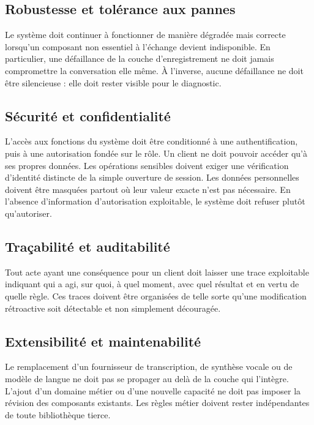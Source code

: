 \subsection{Robustesse et tolérance aux pannes}

Le système doit continuer à fonctionner de manière dégradée mais correcte lorsqu'un composant non essentiel à l'échange devient indisponible. En particulier, une défaillance de la couche d'enregistrement ne doit jamais compromettre la conversation elle même. À l'inverse, aucune défaillance ne doit être silencieuse : elle doit rester visible pour le diagnostic.

\subsection{Sécurité et confidentialité}

L'accès aux fonctions du système doit être conditionné à une authentification, puis à une autorisation fondée sur le rôle. Un client ne doit pouvoir accéder qu'à ses propres données. Les opérations sensibles doivent exiger une vérification d'identité distincte de la simple ouverture de session. Les données personnelles doivent être masquées partout où leur valeur exacte n'est pas nécessaire. En l'absence d'information d'autorisation exploitable, le système doit refuser plutôt qu'autoriser.

\subsection{Traçabilité et auditabilité}

Tout acte ayant une conséquence pour un client doit laisser une trace exploitable indiquant qui a agi, sur quoi, à quel moment, avec quel résultat et en vertu de quelle règle. Ces traces doivent être organisées de telle sorte qu'une modification rétroactive soit détectable et non simplement découragée.

\subsection{Extensibilité et maintenabilité}

Le remplacement d'un fournisseur de transcription, de synthèse vocale ou de modèle de langue ne doit pas se propager au delà de la couche qui l'intègre. L'ajout d'un domaine métier ou d'une nouvelle capacité ne doit pas imposer la révision des composants existants. Les règles métier doivent rester indépendantes de toute bibliothèque tierce.


